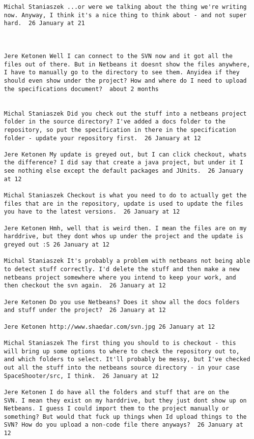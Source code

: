 \documentclass[10pt]{report}
\begin{document}
\begin{verbatim}
Michal Staniaszek ‎...or were we talking about the thing we're writing
now. Anyway, I think it's a nice thing to think about - and not super
hard.  26 January at 21



Jere Ketonen Well I can connect to the SVN now and it got all the
files out of there. But in Netbeans it doesnt show the files anywhere,
I have to manually go to the directory to see them. Anyidea if they
should even show under the project? How and where do I need to upload
the specifications document?  about 2 months 
 

Michal Staniaszek Did you check out the stuff into a netbeans project
folder in the source directory? I've added a docs folder to the
repository, so put the specification in there in the specification
folder - update your repository first.  26 January at 12

Jere Ketonen My update is greyed out, but I can click checkout, whats
the difference? I did say that create a java project, but under it I
see nothing else except the default packages and JUnits.  26 January
at 12

Michal Staniaszek Checkout is what you need to do to actually get the
files that are in the repository, update is used to update the files
you have to the latest versions.  26 January at 12

Jere Ketonen Hmh, well that is weird then. I mean the files are on my
harddrive, but they dont whos up under the project and the update is
greyed out :S 26 January at 12

Michal Staniaszek It's probably a problem with netbeans not being able
to detect stuff correctly. I'd delete the stuff and then make a new
netbeans project somewhere where you intend to keep your work, and
then checkout the svn again.  26 January at 12

Jere Ketonen Do you use Netbeans? Does it show all the docs folders
and stuff under the project?  26 January at 12

Jere Ketonen http://www.shaedar.com/svn.jpg 26 January at 12

Michal Staniaszek The first thing you should to is checkout - this
will bring up some options to where to check the repository out to,
and which folders to select. It'll probably be messy, but I've checked
out all the stuff into the netbeans source directory - in your case
SpaceShooter/src, I think.  26 January at 12

Jere Ketonen I do have all the folders and stuff that are on the
SVN. I mean they exist on my harddrive, but they just dont show up on
Netbeans. I guess I could import them to the project manually or
something? But would that fuck up things when Id upload things to the
SVN? How do you upload a non-code file there anyways?  26 January at
12


\end{verbatim}
\end{document}
